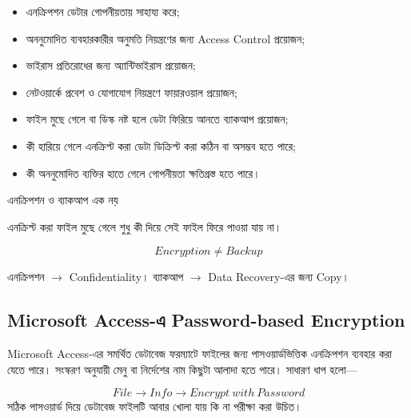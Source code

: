 \begin{itemize}

    \item এনক্রিপশন ডেটার গোপনীয়তায় সাহায্য করে;

    \item অননুমোদিত ব্যবহারকারীর অনুমতি নিয়ন্ত্রণের জন্য
          Access Control প্রয়োজন;

    \item ভাইরাস প্রতিরোধের জন্য অ্যান্টিভাইরাস প্রয়োজন;

    \item নেটওয়ার্কে প্রবেশ ও যোগাযোগ নিয়ন্ত্রণে ফায়ারওয়াল প্রয়োজন;

    \item ফাইল মুছে গেলে বা ডিস্ক নষ্ট হলে ডেটা ফিরিয়ে আনতে
          ব্যাকআপ প্রয়োজন;

    \item কী হারিয়ে গেলে এনক্রিপ্ট করা ডেটা ডিক্রিপ্ট করা কঠিন বা
          অসম্ভব হতে পারে;

    \item কী অননুমোদিত ব্যক্তির হাতে গেলে গোপনীয়তা ক্ষতিগ্রস্ত
          হতে পারে।

\end{itemize}


\begin{mistakebox}{এনক্রিপশন ও ব্যাকআপ এক নয়}

এনক্রিপ্ট করা ফাইল মুছে গেলে শুধু কী দিয়ে সেই ফাইল ফিরে পাওয়া যায় না।

\[
\boxed{
Encryption
\neq
Backup
}
\]

এনক্রিপশন $\rightarrow$ Confidentiality। ব্যাকআপ $\rightarrow$ Data Recovery-এর জন্য Copy।

\end{mistakebox}



\subsection{Microsoft Access-এ Password-based Encryption}

Microsoft Access-এর সমর্থিত ডেটাবেজ ফরম্যাটে ফাইলের জন্য পাসওয়ার্ডভিত্তিক এনক্রিপশন ব্যবহার করা যেতে পারে। সংস্করণ অনুযায়ী মেনু বা নির্দেশের নাম কিছুটা আলাদা হতে পারে। সাধারণ ধাপ হলো---

\[
File
\rightarrow
Info
\rightarrow
Encrypt\ with\ Password
\]
সঠিক পাসওয়ার্ড দিয়ে ডেটাবেজ ফাইলটি আবার খোলা যায় কি না পরীক্ষা করা উচিত।

